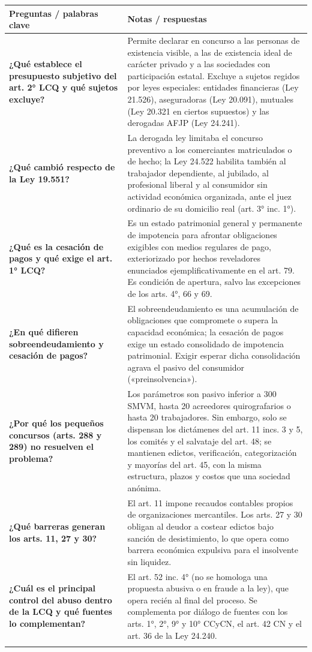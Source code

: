 \documentclass[12pt,oneside]{book}
\makeatletter
\newcommand{\cornellrow}[2]{\textbf{#1} & #2 \\ \addlinespace[0.8em]}
\newenvironment{cornell}[1]{%
    \par\medskip
    \noindent{\large\bfseries Cuadro Cornell --- #1}\par\smallskip
    \begin{longtable}{@{}>{\raggedright\arraybackslash}p{0.25\textwidth}>{\raggedright\arraybackslash}p{0.69\textwidth}@{}}
    \toprule
    \textbf{Preguntas / palabras clave} & \textbf{Notas / respuestas} \\
    \midrule
    \endhead
}{%
    \bottomrule
    \end{longtable}
}
\makeatother
\begin{document}
\begin{cornell}{Análisis normativo}
\cornellrow{¿Qué establece el presupuesto subjetivo del art. 2° LCQ y qué sujetos excluye?}{Permite declarar en concurso a las personas de existencia visible, a las de existencia ideal de carácter privado y a las sociedades con participación estatal. Excluye a sujetos regidos por leyes especiales: entidades financieras (Ley 21.526), aseguradoras (Ley 20.091), mutuales (Ley 20.321 en ciertos supuestos) y las derogadas AFJP (Ley 24.241).}
\cornellrow{¿Qué cambió respecto de la Ley 19.551?}{La derogada ley limitaba el concurso preventivo a los comerciantes matriculados o de hecho; la Ley 24.522 habilita también al trabajador dependiente, al jubilado, al profesional liberal y al consumidor sin actividad económica organizada, ante el juez ordinario de su domicilio real (art. 3° inc. 1°).}
\cornellrow{¿Qué es la cesación de pagos y qué exige el art. 1° LCQ?}{Es un estado patrimonial general y permanente de impotencia para afrontar obligaciones exigibles con medios regulares de pago, exteriorizado por hechos reveladores enunciados ejemplificativamente en el art. 79. Es condición de apertura, salvo las excepciones de los arts. 4°, 66 y 69.}
\cornellrow{¿En qué difieren sobreendeudamiento y cesación de pagos?}{El sobreendeudamiento es una acumulación de obligaciones que compromete o supera la capacidad económica; la cesación de pagos exige un estado consolidado de impotencia patrimonial. Exigir esperar dicha consolidación agrava el pasivo del consumidor («preinsolvencia»).}
\cornellrow{¿Por qué los pequeños concursos (arts. 288 y 289) no resuelven el problema?}{Los parámetros son pasivo inferior a 300 SMVM, hasta 20 acreedores quirografarios o hasta 20 trabajadores. Sin embargo, solo se dispensan los dictámenes del art. 11 incs. 3 y 5, los comités y el salvataje del art. 48; se mantienen edictos, verificación, categorización y mayorías del art. 45, con la misma estructura, plazos y costos que una sociedad anónima.}
\cornellrow{¿Qué barreras generan los arts. 11, 27 y 30?}{El art. 11 impone recaudos contables propios de organizaciones mercantiles. Los arts. 27 y 30 obligan al deudor a costear edictos bajo sanción de desistimiento, lo que opera como barrera económica expulsiva para el insolvente sin liquidez.}
\cornellrow{¿Cuál es el principal control del abuso dentro de la LCQ y qué fuentes lo complementan?}{El art. 52 inc. 4° (no se homologa una propuesta abusiva o en fraude a la ley), que opera recién al final del proceso. Se complementa por diálogo de fuentes con los arts. 1°, 2°, 9° y 10° CCyCN, el art. 42 CN y el art. 36 de la Ley 24.240.}

\end{cornell}
\end{document}
